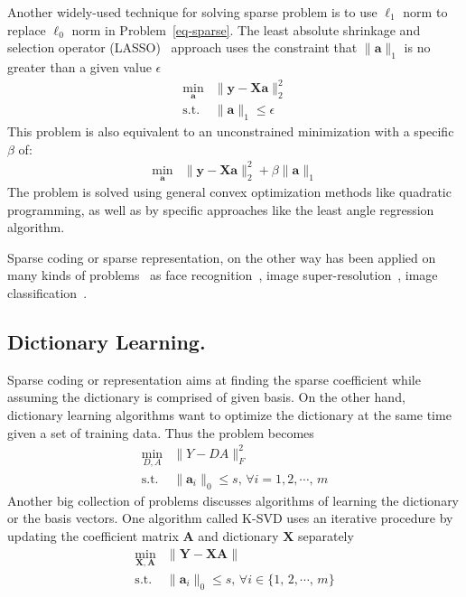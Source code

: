 Another widely-used technique for solving sparse problem is to use $\ell_1$ norm to replace $\ell_0$ norm in Problem~\ref{eq-sparse}.
The least absolute shrinkage and selection operator (LASSO)~\cite{tibshirani1996regression} approach uses the constraint that $\|\mathbf{a}\|_1$ is no greater than a given value $\epsilon$
\begin{equation}
\begin{array}{cl}
\min_{\mathbf{a}} & \|\mathbf{y}-\mathbf{X}\mathbf{a}\|_2^2\\
\mathrm{s.t.} & \|\mathbf{a}\|_1 \leq \epsilon
\end{array}
\end{equation}
This problem is also equivalent to an unconstrained minimization with a specific $\beta$ of:
\begin{equation}
\begin{array}{cl}
\min_{\mathbf{a}} & \|\mathbf{y}-\mathbf{X}\mathbf{a}\|_2^2 + \beta \|\mathbf{a}\|_1
\end{array}
\end{equation}
The problem is solved using general convex optimization methods like quadratic programming, as well as by specific approaches like the least angle regression~\cite{efron2004least} algorithm.

Sparse coding or sparse representation, on the other way has been applied on many kinds of problems~\cite{wright2010sparse} as face recognition~\cite{wright2009robust}, image super-resolution~\cite{yang2008image}, image classification~\cite{mairal2008discriminative}.

\subsection{Dictionary Learning.}
Sparse coding or representation aims at finding the sparse coefficient while assuming the dictionary is comprised of given basis.
On the other hand, dictionary learning algorithms want to optimize the dictionary at the same time given a set of training data.
Thus the problem becomes
\begin{equation}
\begin{array}{cl}
\min_{D,A} & \|Y-DA\|_F^2\\
\mathrm{s.t.} & \|\mathbf{a}_i\|_0 \leq s,\,\forall i=1,2,\cdots,\,m
\end{array}
\end{equation}
Another big collection of problems discusses algorithms of learning the dictionary or the basis vectors.
One algorithm called K-SVD uses an iterative procedure by updating the coefficient matrix $\mathbf{A}$ and dictionary $\mathbf{X}$ separately
\begin{equation}
\begin{array}{cl}
\min_{\mathbf{X},\mathbf{A}} & \|\mathbf{Y}-\mathbf{X}\mathbf{A}\| \\
\mathrm{s.t.} & \|\mathbf{a}_i\|_0 \leq s,\,\forall i\in\{1,\,2,\cdots ,\,m\}
\end{array}
\end{equation}

